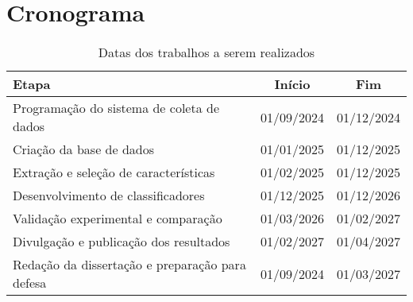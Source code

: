 			\newpage
	
	\section{Cronograma}
		\label{sec:cronograma}
	
		\begin{table}[h!]
			\centering
			\caption{Datas dos trabalhos a serem realizados}
			\begin{tabular}{|p{10cm}|c|c|}
				\hline
				\textbf{Etapa} & \textbf{Início} & \textbf{Fim} \\
				\hline
				Programação do sistema de coleta de dados & 01/09/2024 & 01/12/2024 \\
				\hline
				Criação da base de dados & 01/01/2025 & 01/12/2025 \\
				\hline
				Extração e seleção de características & 01/02/2025 & 01/12/2025 \\
				\hline
				Desenvolvimento de classificadores & 01/12/2025 & 01/12/2026 \\
				\hline
				Validação experimental e comparação & 01/03/2026 & 01/02/2027 \\
				\hline
				Divulgação e publicação dos resultados & 01/02/2027 & 01/04/2027 \\
				\hline
				Redação da dissertação e preparação para defesa & 01/09/2024 & 01/03/2027 \\
				\hline
			\end{tabular}
			\label{tab:cronograma}
		\end{table}
		
